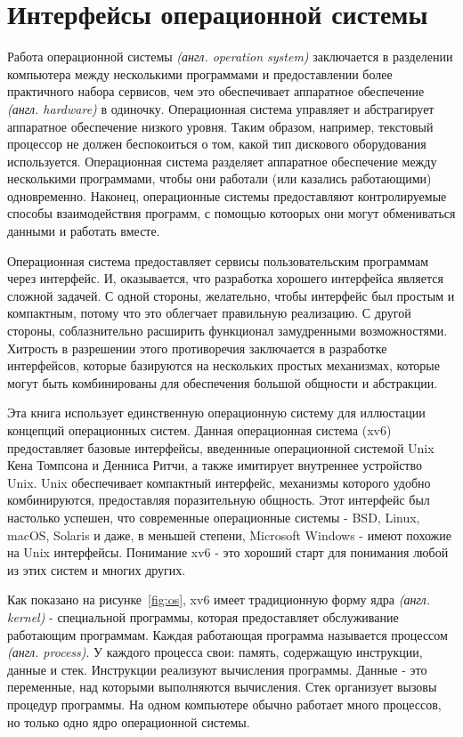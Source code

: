 \chapter{Интерфейсы операционной системы}
\label{CH:UNIX}

Работа операционной системы
\emph{(англ. operation system)} заключается
в разделении компьютера между несколькими программами
и предоставлении более практичного набора сервисов,
чем это обеспечивает аппаратное обеспечение
\emph{(англ. hardware)} в одиночку.
Операционная система управляет и абстрагирует
аппаратное обеспечение низкого уровня.
Таким образом, например,
текстовый процессор не должен беспокоиться о том,
какой тип дискового оборудования используется.
Операционная система разделяет
аппаратное обеспечение между несколькими программами,
чтобы они работали (или казались работающими) одновременно.
Наконец, операционные системы предоставляют
контролируемые способы взаимодействия программ,
с помощью котоорых они могут
обмениваться данными и работать вместе.

Операционная система предоставляет сервисы
пользовательским программам через интерфейс.
И, оказывается, что разработка хорошего интерфейса
является сложной задачей.
С одной стороны, желательно,
чтобы интерфейс был простым и компактным,
потому что это облегчает правильную реализацию.
С другой стороны, соблазнительно
расширить функционал замудренными возможностями.
Хитрость в разрешении этого противоречия
заключается в разработке интерфейсов,
которые базируются на нескольких простых механизмах,
которые могут быть комбинированы для обеспечения
большой общности и абстракции.

Эта книга использует единственную операционную систему
для иллюстации концепций операционных систем.
Данная операционная система (xv6)
предоставляет базовые интерфейсы,
введеннные операционной системой Unix~\cite{unix}
Кена Томпсона и Денниса Ритчи,
а также имитирует внутреннее устройство Unix.
Unix обеспечивает компактный интерфейс,
механизмы которого удобно комбинируются,
предоставляя поразительную общность.
Этот интерфейс был настолько успешен,
что современные операционные системы -
BSD, Linux, macOS, Solaris и даже,
в меньшей степени, Microsoft Windows -
имеют похожие на Unix интерфейсы.
Понимание xv6 - это хороший старт для понимания
любой из этих систем и многих других.

Как показано на рисунке~\ref{fig:os},
xv6 имеет традиционную форму ядра \emph{(англ. kernel)} -
специальной программы, которая предоставляет
обслуживание работающим программам.
Каждая работающая программа называется процессом \emph{(англ. process)}.
У каждого процесса свои:
память, содержащую инструкции, данные и стек.
Инструкции реализуют вычисления программы.
Данные - это переменные,
над которыми выполняются вычисления.
Стек организует вызовы процедур программы.
На одном компьютере обычно работает много процессов,
но только одно ядро операционной системы.

